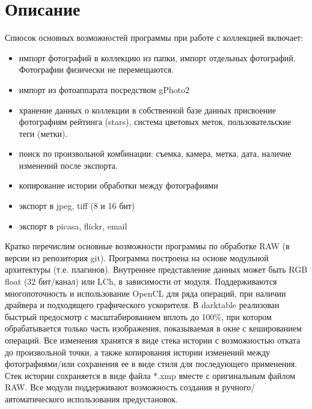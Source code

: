 \documentclass[10pt, a5paper]{article}
\begin{document}
\section*{Описание}
Спиосок основных возможностей программы при работе с коллекцией включает:
\begin{itemize}
\item импорт фотографий в коллекцию из папки, импорт отдельных фотографий. Фотографии физически не перемещаются.
\item импорт из фотоаппарата посредством gPhoto2
\item хранение данных о коллекции в собственной базе данных
присвоение фотографиям рейтинга (stars), система цветовых меток, пользовательские теги (метки).
\item поиск по произвольной комбинации: съемка, камера, метка, дата, наличие изменений после экспорта.
\item копирование истории обработки между фотографиями
\item экспорт в jpeg, tiff (8 и 16 бит) 
\item экспорт в picasa, flickr, email
	\end{itemize} 
Кратко перечислим основные возможности программы по обработке RAW (в версии из репозитория git). Программа построена на основе модульной архитектуры (т.е. плагинов). Внутреннее представление данных может быть RGB float (32 бит/канал) или LCh, в зависимости от модуля. Поддерживаются многопоточность и использование OpenCL для ряда операций, при наличии драйвера и подходящего графического ускорителя.
В darktable реализован быстрый предосмотр с масштабированием вплоть до 100\%, при котором обрабатывается только часть изображения, показываемая в окне с кешированием операций. Все изменения хранятся в виде стека истории с возможностью отката до произвольной точки, а также копирования истории изменений между фотографиями/или сохранения ее в виде стиля для последующего применения. Стек истории сохраняется в виде файла *.xmp вместе с оригинальным файлом RAW.
Все модули поддерживают возможность создания и ручного/автоматического использования предустановок. 
\begin{figure}[ht]
\end{figure}
\end{document}
